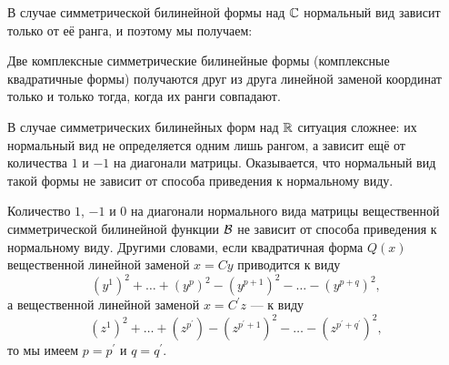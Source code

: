В случае симметрической билинейной формы над $\mathbb{C}$ нормальный вид зависит только от её ранга, и поэтому мы получаем:

\begin{proposal}
    Две комплексные симметрические билинейные формы (комплексные квадратичные формы) получаются друг из друга линейной заменой координат только и только тогда, когда их ранги совпадают.
\end{proposal}

В случае симметрических билинейных форм над $\mathbb{R}$ ситуация сложнее: их нормальный вид не определяется одним лишь рангом, а зависит ещё от количества $1$ и $-1$ на диагонали матрицы. Оказывается, что нормальный вид такой формы не зависит от способа приведения к нормальному виду.

\begin{theorem}
    Количество $1$, $-1$ и $0$ на диагонали нормального вида матрицы вещественной симметрической билинейной функции $\mathcal{B}$ не зависит от способа приведения к нормальному виду.
    Другими словами, если квадратичная форма $Q(x)$ вещественной линейной заменой $x = Cy$ приводится к виду
    \[
        (y^1)^2 + \ldots + (y^p)^2 - (y^{p + 1})^2 - \ldots - (y^{p + q})^2,
    \]
    а вещественной линейной заменой $x = C^\prime z$ --- к виду
    \[
        (z^1)^2 + \ldots + (z^{p^\prime}) - (z^{p^\prime + 1})^2 - \ldots - (z^{p^\prime + q^\prime})^2,
    \]
    то мы имеем $p = p^\prime$ и $q = q^\prime$.
\end{theorem}

